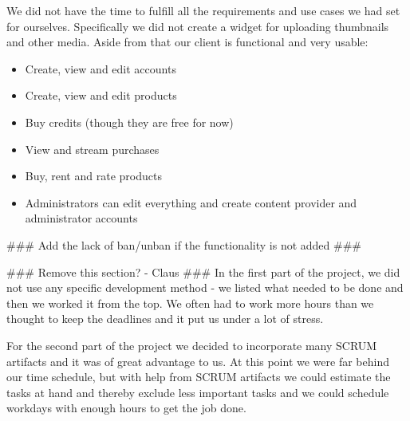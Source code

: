 We did not have the time to fulfill all the requirements and use cases we had set for ourselves. Specifically we did not create a widget for uploading thumbnails and other media. Aside from that our client is functional and very usable:
\begin{itemize}
\item Create, view and edit accounts
\item Create, view and edit products
\item Buy credits (though they are free for now)
\item View and stream purchases
\item Buy, rent and rate products
\item Administrators can edit everything and create content provider and administrator accounts
\end{itemize}

\#\#\# Add the lack of ban/unban if the functionality is not added \#\#\#

\#\#\# Remove this section? - Claus \#\#\#
In the first part of the project, we did not use any specific development method - we listed what needed to be done and then we worked it from the top. We often had to work more hours than we thought to keep the deadlines and it put us under a lot of stress.

For the second part of the project we decided to incorporate many SCRUM artifacts and it was of great advantage to us. At this point we were far behind our time schedule, but with help from SCRUM artifacts we could estimate the tasks at hand and thereby exclude less important tasks and we could schedule workdays with enough hours to get the job done.
\newpage